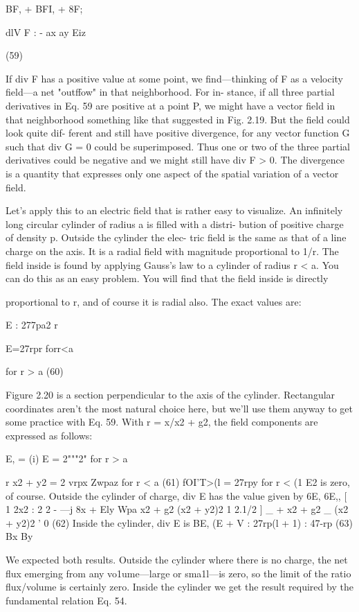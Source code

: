 BF, + BFI, + 8F;

dlV F : -
ax ay Eiz

(59)

If div F has a positive value at some point, we find---thinking of F
as a velocity field---a net "outffow" in that neighborhood. For in-
stance, if all three partial derivatives in Eq. 59 are positive at a
point P, we might have a vector field in that neighborhood something
like that suggested in Fig. 2.19. But the field could look quite dif-
ferent and still have positive divergence, for any vector function G
such that div G = 0 could be superimposed. Thus one or two of the
three partial derivatives could be negative and we might still have
div F > 0. The divergence is a quantity that expresses only one
aspect of the spatial variation of a vector field.

Let's apply this to an electric field that is rather easy to visualize.
An infinitely long circular cylinder of radius a is filled with a distri-
bution of positive charge of density p. Outside the cylinder the elec-
tric field is the same as that of a line charge on the axis. It is a radial
field with magnitude proportional to 1/r. The field inside is found
by applying Gauss's law to a cylinder of radius r < a. You can do
this as an easy problem. You will find that the field inside is directly

proportional to r, and of course it is radial also. The exact values
are:

E : 277pa2
r

E=27rpr forr<a

for r > a
(60)

Figure 2.20 is a section perpendicular to the axis of the cylinder.
Rectangular coordinates aren't the most natural choice here, but
we'll use them anyway to get some practice with Eq. 59. With
r = x/x2 + g2, the field components are expressed as follows:

E, = (i) E = 2"""2" for r > a

r x2 + y2
= 2
vrpx Zwpaz for r < a (61)
 fOI'T>(l
= 27rpy for r < (1
E2 is zero, of course.
Outside the cylinder of charge, div E has the value given by
6E, 6E,, [ 1 2x2
: 2 2 - ---j
8x + Ely Wpa x2 + g2 (x2 + y2)2
1 2.1/2 ] _
+ x2 + g2 _ (x2 + y2)2 ' 0 (62)
Inside the cylinder, div E is
BE, (E
+ V : 27rp(l + 1) : 47-rp (63)
Bx By

We expected both results. Outside the cylinder where there is no
charge, the net flux emerging from any vo1ume---large or sma1l---is
zero, so the limit of the ratio flux/volume is certainly zero. Inside the
cylinder we get the result required by the fundamental relation Eq. 54.

